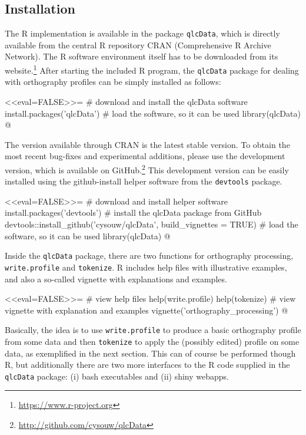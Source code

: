 \subsection*{Installation}

The R implementation is available in the package \texttt{qlcData}, which is 
directly available from the central R repository CRAN (Comprehensive R Archive 
Network). The R software environment itself has to be downloaded from its 
website.\footnote{\url{https://www.r-project.org}} After starting the included 
R program, the \texttt{qlcData} package for dealing with orthography profiles can be 
simply installed as follows:

<<eval=FALSE>>=
# download and install the qlcData software
install.packages('qlcData') 
# load the software, so it can be used
library(qlcData) 
@

The version available through CRAN is the latest stable version.
To obtain the most recent bug-fixes and experimental additions, please use the
development version, which is available on
GitHub.\footnote{\url{http://github.com/cysouw/qlcData}} This development
version can be easily installed using the github-install helper software from the
\texttt{devtools} package.

<<eval=FALSE>>=
# download and install helper software
install.packages('devtools') 
# install the qlcData package from GitHub
devtools::install_github('cysouw/qlcData', build_vignettes = TRUE)
# load the software, so it can be used 
library(qlcData) 
@

Inside the \texttt{qlcData} package, there are two functions for
orthography processing, \texttt{write.profile} and \texttt{tokenize}. R includes
help files with illustrative examples, and also a so-called vignette with
explanations and examples.

<<eval=FALSE>>=
# view help files
help(write.profile)
help(tokenize)
# view vignette with explanation and examples
vignette('orthography_processing')
@

Basically, the idea is to use \texttt{write.profile} to produce a
basic orthography profile from some data and then \texttt{tokenize} to apply the
(possibly edited) profile on some data, as exemplified in the next section. This
can of course be performed though R, but additionally there are two more
interfaces to the R code supplied in the \texttt{qlcData} package: (i) bash
executables and (ii) shiny webapps.

